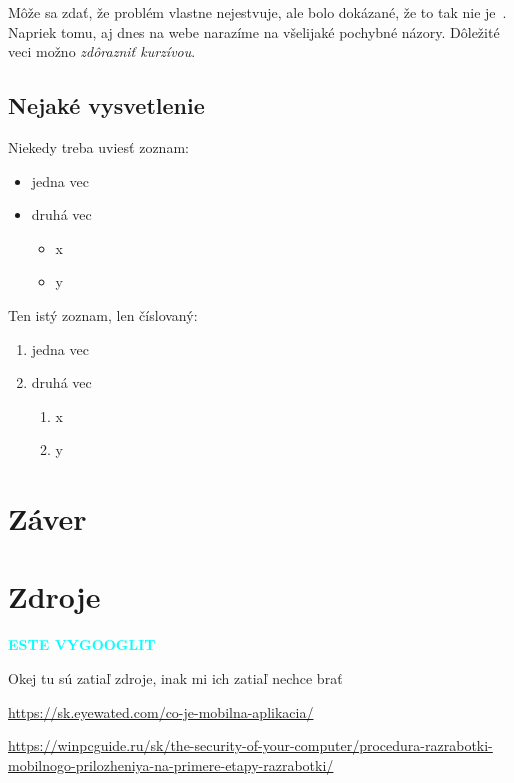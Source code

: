 \documentclass[10pt,twoside,slovak,a4paper]{article}
\begin{document}
Môže sa zdať, že problém vlastne nejestvuje\cite{Coplien:MPD}, ale bolo dokázané, že to tak nie je~\cite{Czarnecki:Staged, Czarnecki:Progress}. Napriek tomu, aj dnes na webe narazíme na všelijaké pochybné názory\cite{PLP-Framework}. Dôležité veci možno \emph{zdôrazniť kurzívou}.


\subsection{Nejaké vysvetlenie} \label{ina:nejake}

Niekedy treba uviesť zoznam:

\begin{itemize}
\item jedna vec
\item druhá vec
	\begin{itemize}
	\item x
	\item y
	\end{itemize}
\end{itemize}

Ten istý zoznam, len číslovaný:

\begin{enumerate}
\item jedna vec
\item druhá vec
	\begin{enumerate}
	\item x
	\item y
	\end{enumerate}
\end{enumerate}




\section{Záver} \label{zaver} %



\section{Zdroje}
\textcolor{cyan}{{\textbf{\huge ESTE VYGOOGLIT}}}

Okej tu sú zatiaľ zdroje, inak mi ich zatiaľ nechce brať

\url{https://sk.eyewated.com/co-je-mobilna-aplikacia/}

\url{https://winpcguide.ru/sk/the-security-of-your-computer/procedura-razrabotki-mobilnogo-prilozheniya-na-primere-etapy-razrabotki/}
\end{document}
